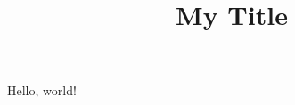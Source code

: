 \documentclass{article}
\title{My Title}
\author{}
\date{}
\begin{document}
\maketitle

Hello, world!
\end{document}
